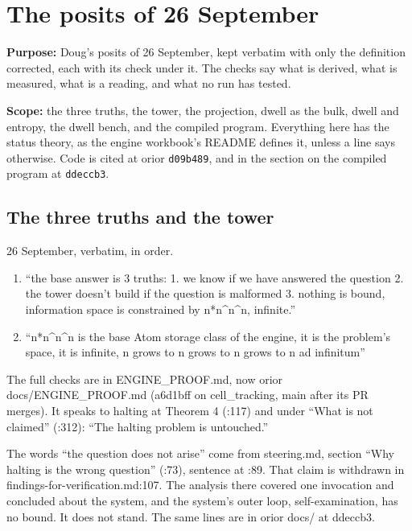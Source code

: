 \chapter{\texorpdfstring{The posits of 26 September}{The posits of 26 September}}
\label{chap:posits-26-september}

\textbf{Purpose:} Doug's posits of 26 September, kept verbatim with only the definition corrected, each with its check under it. The checks say what is derived, what is measured, what is a reading, and what no run has tested.

\textbf{Scope:} the three truths, the tower, the projection, dwell as the bulk, dwell and entropy, the dwell bench, and the compiled program. Everything here has the status theory, as the engine workbook's README defines it, unless a line says otherwise. Code is cited at orior \texttt{d09b489}, and in the section on the compiled program at \texttt{ddeccb3}.

\section{\texorpdfstring{The three truths and the tower}{The three truths and the tower}}

26 September, verbatim, in order.

\begin{enumerate}
\item “the base answer is 3 truths: 1. we know if we have answered the question 2. the tower doesn't build if the question is malformed 3. nothing is bound, information space is constrained by n*n\textasciicircum{}n\textasciicircum{}n, infinite.”
\item “n*n\textasciicircum{}n\textasciicircum{}n is the base Atom storage class of the engine, it is the problem's space, it is infinite, n grows to n grows to n grows to n ad infinitum”
\end{enumerate}

The full checks are in ENGINE\_\allowbreak{}PROOF.md, now orior docs/ENGINE\_\allowbreak{}PROOF.md (a6d1bff on cell\_\allowbreak{}tracking, main after its PR merges). It speaks to halting at Theorem 4 (:117) and under “What is not claimed” (:312): “The halting problem is untouched.”

The words “the question does not arise” come from steering.md, section “Why halting is the wrong question” (:73), sentence at :89. That claim is withdrawn in findings-for-verification.md:107. The analysis there covered one invocation and concluded about the system, and the system's outer loop, self-examination, has no bound. It does not stand. The same lines are in orior docs/ at ddeccb3.

